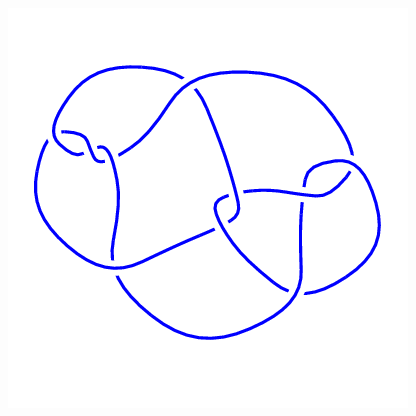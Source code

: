 \begin{figure}[H]
\begin{minipage}[b]{.18\linewidth}
    \end{minipage}
    \begin{minipage}[b]{.18\linewidth}
        \centering
        \includegraphics[width=\linewidth]{../data/10_51.png}
    \end{minipage}
\end{figure}
